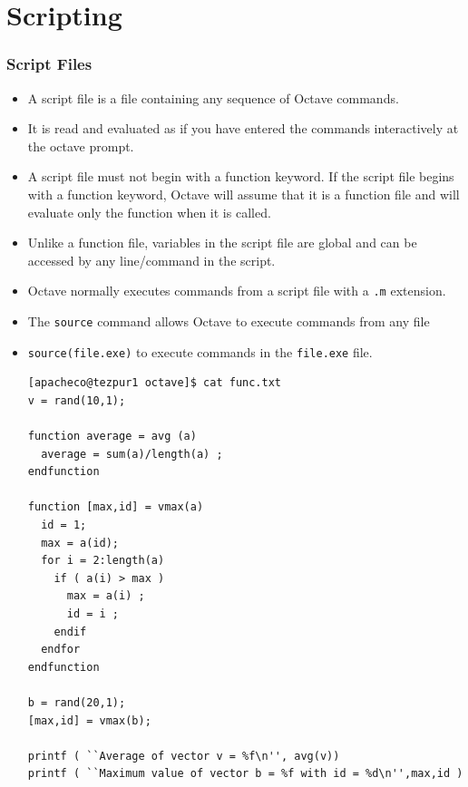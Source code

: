 \documentclass[slidestop,mathserif,compress,xcolor=svgnames]{beamer}
\begin{document}
\section{Scripting}
\begin{frame}
  \frametitle{\small Script Files}
  \begin{itemize}
    \item A script file is a file containing any sequence of Octave commands.
    \item It is read and evaluated as if you have entered the commands interactively at the octave prompt.
    \item A script file must not begin with a function keyword. If the script file begins with a function keyword, Octave will assume that it is a function file and will evaluate only the function when it is called.
    \item Unlike a function file, variables in the script file are global and can be accessed by any line/command in the script.
    \item Octave normally executes commands from a script file with a \texttt{.m} extension.
    \item The \texttt{source} command allows Octave to execute commands from any file
    \item[] \texttt{source(file.exe)} to execute commands in the \texttt{file.exe} file.
    {\tiny
      \begin{verbatim}
[apacheco@tezpur1 octave]$ cat func.txt
v = rand(10,1);

function average = avg (a)
  average = sum(a)/length(a) ;
endfunction

function [max,id] = vmax(a)
  id = 1;
  max = a(id);
  for i = 2:length(a)
    if ( a(i) > max )
      max = a(i) ;
      id = i ;
    endif
  endfor
endfunction

b = rand(20,1);
[max,id] = vmax(b); 

printf ( ``Average of vector v = %f\n'', avg(v)) 
printf ( ``Maximum value of vector b = %f with id = %d\n'',max,id )


\end{verbatim}}
\end{itemize}
\end{frame}
\end{document}
